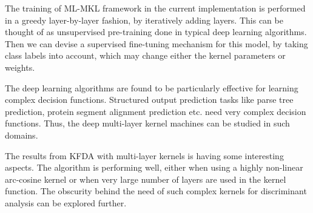 The training of ML-MKL framework in the current implementation is performed in a greedy layer-by-layer fashion, by iteratively adding layers. This can be thought of as unsupervised pre-training done in typical deep learning algorithms. Then we can devise a supervised fine-tuning mechanism for this model, by taking class labels into account, which may change either the kernel parameters or weights.

The deep learning algorithms are found to be particularly effective for learning complex decision functions. Structured output prediction tasks like parse tree prediction, protein segment alignment prediction etc. need very complex decision functions. Thus, the deep multi-layer kernel machines can be studied in such domains.

The results from KFDA with multi-layer kernels is having some interesting aspects. The algorithm is performing well, either when using a highly non-linear arc-cosine kernel or when very large number of layers are used in the kernel function. The obscurity behind the need of such complex kernels for 
discriminant analysis can be explored further.

